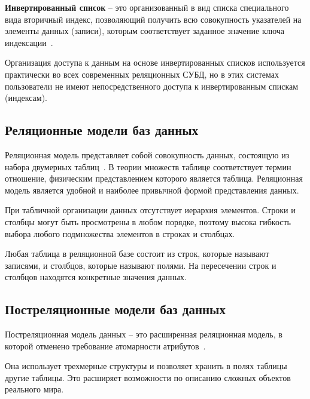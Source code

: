 \textbf{Инвертированный список} -- это организованный в вид списка специального вида вторичный индекс, позволяющий получить всю совокупность указателей на элементы данных (записи), которым соответствует заданное значение ключа индексации~\cite{inv_list}.

Организация доступа к данным на основе инвертированных списков используется практически во всех современных реляционных СУБД, но в этих системах пользователи не имеют непосредственного доступа к инвертированным спискам (индексам).

\subsection{Реляционные модели баз данных}

Реляционная модель представляет собой совокупность данных, состоящую из набора двумерных таблиц~\cite{relat}. 
В теории множеств таблице соответствует термин отношение, физическим представлением которого является таблица.
Реляционная модель является удобной и наиболее привычной формой представления данных.

При табличной организации данных отсутствует иерархия элементов. 
Строки и столбцы могут быть просмотрены в любом порядке, поэтому высока гибкость выбора любого подмножества элементов в строках и столбцах.

Любая таблица в реляционной базе состоит из строк, которые называют записями, и столбцов, которые называют полями. 
На пересечении строк и столбцов находятся конкретные значения данных.


\subsection{Постреляционные модели баз данных}

Постреляционная модель данных -- это расширенная реляционная модель, в которой отменено требование атомарности атрибутов~\cite{postrelat}.

Она использует трехмерные структуры и позволяет хранить в полях таблицы другие таблицы.
Это расширяет возможности по описанию сложных объектов реального мира.

